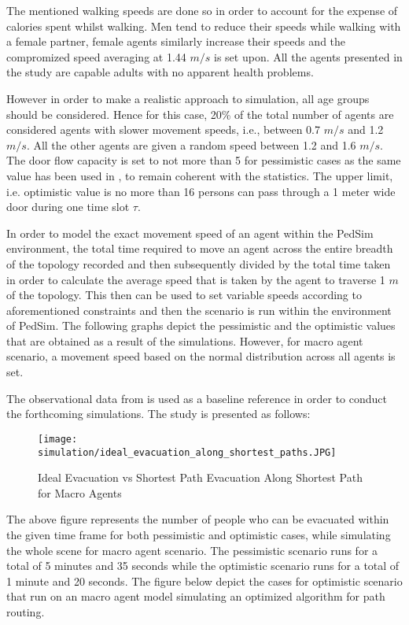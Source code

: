 The mentioned walking speeds are done so in order to account for the expense of calories spent whilst walking. Men tend to reduce their speeds while walking with a female partner, female agents similarly increase their speeds and the compromized speed averaging at 1.44 $m/s$ is set upon. All the agents presented in the study are capable adults with no apparent health problems. 

However in order to make a realistic approach to simulation, all age groups should be considered. Hence for this case, 20\% of the total number of agents are considered agents with slower movement speeds, i.e., between 0.7 $m/s$ and 1.2 $m/s$. All the other agents are given a random speed between 1.2 and 1.6 $m/s$. The door flow capacity is set to not more than 5 for pessimistic cases as the same value has been used in \cite{ref5}, to remain coherent with the statistics. The upper limit, i.e. optimistic value is no more than 16 persons can pass through a 1 meter wide door during one time slot $\tau$. 

In order to model the exact movement speed of an agent within the PedSim environment, the total time required to move an agent across the entire breadth of the topology recorded and then subsequently divided by the total time taken in order to calculate the average speed that is taken by the agent to traverse 1 $m$ of the topology. This then can be used to set variable speeds according to aforementioned constraints and then the scenario is run within the environment of PedSim. The following graphs depict the pessimistic and the optimistic values that are obtained as a result of the simulations. However, for macro agent scenario, a movement speed based on the normal distribution across all agents is set.

The observational data from \cite{ref5} is used as a baseline reference in order to conduct the forthcoming simulations. The study is presented as follows:

\begin{figure}[H]
  \centering
  \texttt{[image: simulation/ideal\_evacuation\_along\_shortest\_paths.JPG]}
  \caption{Ideal Evacuation vs Shortest Path Evacuation Along Shortest Path for Macro Agents}
  \label{Ideal Evacuation vs Shortest Path Evacuation Along Shortest Path for Macro Agents}
\end{figure}

The above figure represents the number of people who can be evacuated within the given time frame for both pessimistic and optimistic cases, while simulating the whole scene for macro agent scenario. The pessimistic scenario runs for a total of 5 minutes and 35 seconds while the optimistic scenario runs for a total of 1 minute and 20 seconds. The figure below depict the cases for optimistic scenario that run on an macro agent model simulating an optimized algorithm for path routing.

